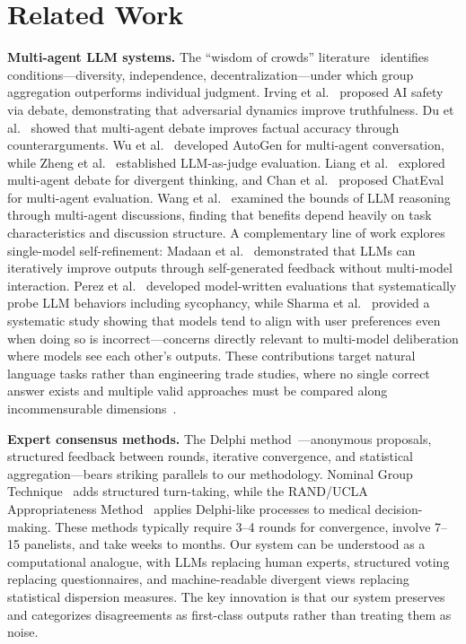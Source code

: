 \documentclass[11pt,a4paper]{article}
\begin{document}
\section{Related Work}
\label{sec:related}

\textbf{Multi-agent LLM systems.} The ``wisdom of crowds'' literature~\cite{surowiecki2004wisdom} identifies conditions---diversity, independence, decentralization---under which group aggregation outperforms individual judgment. Irving et al.~\cite{irving2018debate} proposed AI safety via debate, demonstrating that adversarial dynamics improve truthfulness. Du et al.~\cite{du2023debate} showed that multi-agent debate improves factual accuracy through counterarguments. Wu et al.~\cite{wu2023autogen} developed AutoGen for multi-agent conversation, while Zheng et al.~\cite{zheng2024judging} established LLM-as-judge evaluation. Liang et al.~\cite{liang2024encouraging} explored multi-agent debate for divergent thinking, and Chan et al.~\cite{chan2024chateval} proposed ChatEval for multi-agent evaluation. Wang et al.~\cite{wang2024rethinking} examined the bounds of LLM reasoning through multi-agent discussions, finding that benefits depend heavily on task characteristics and discussion structure. A complementary line of work explores single-model self-refinement: Madaan et al.~\cite{madaan2023self} demonstrated that LLMs can iteratively improve outputs through self-generated feedback without multi-model interaction. Perez et al.~\cite{perez2022sycophancy} developed model-written evaluations that systematically probe LLM behaviors including sycophancy, while Sharma et al.~\cite{sharma2024sycophancy} provided a systematic study showing that models tend to align with user preferences even when doing so is incorrect---concerns directly relevant to multi-model deliberation where models see each other's outputs. These contributions target natural language tasks rather than engineering trade studies, where no single correct answer exists and multiple valid approaches must be compared along incommensurable dimensions~\cite{keeney1976decisions}.

\textbf{Expert consensus methods.} The Delphi method~\cite{linstone1975delphi,dalkey1963experimental}---anonymous proposals, structured feedback between rounds, iterative convergence, and statistical aggregation---bears striking parallels to our methodology. Nominal Group Technique~\cite{delbecq1975group} adds structured turn-taking, while the RAND/UCLA Appropriateness Method~\cite{fitch2001rand} applies Delphi-like processes to medical decision-making. These methods typically require 3--4 rounds for convergence, involve 7--15 panelists, and take weeks to months. Our system can be understood as a computational analogue, with LLMs replacing human experts, structured voting replacing questionnaires, and machine-readable divergent views replacing statistical dispersion measures. The key innovation is that our system preserves and categorizes disagreements as first-class outputs rather than treating them as noise.
\end{document}
